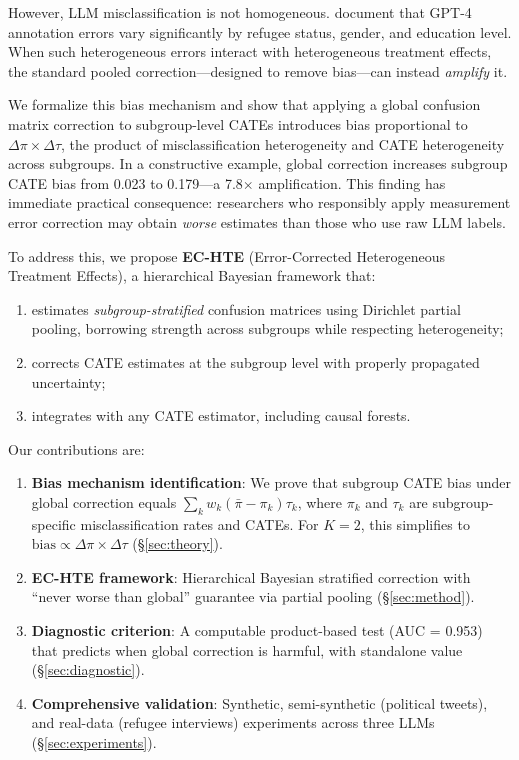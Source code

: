 \documentclass[11pt,a4paper]{article}
\newcommand{\bias}{\mathrm{bias}}
\begin{document}
However, LLM misclassification is not homogeneous. \citet{ashwin2025refugee} document that GPT-4 annotation errors vary significantly by refugee status, gender, and education level. When such heterogeneous errors interact with heterogeneous treatment effects, the standard pooled correction---designed to remove bias---can instead \emph{amplify} it.

We formalize this bias mechanism and show that applying a global confusion matrix correction to subgroup-level CATEs introduces bias proportional to $\Delta\pi \times \Delta\tau$, the product of misclassification heterogeneity and CATE heterogeneity across subgroups. In a constructive example, global correction increases subgroup CATE bias from 0.023 to 0.179---a 7.8$\times$ amplification. This finding has immediate practical consequence: researchers who responsibly apply measurement error correction may obtain \emph{worse} estimates than those who use raw LLM labels.

To address this, we propose \textbf{EC-HTE} (Error-Corrected Heterogeneous Treatment Effects), a hierarchical Bayesian framework that:
\begin{enumerate}[nosep,leftmargin=*]
\item estimates \emph{subgroup-stratified} confusion matrices using Dirichlet partial pooling, borrowing strength across subgroups while respecting heterogeneity;
\item corrects CATE estimates at the subgroup level with properly propagated uncertainty;
\item integrates with any CATE estimator, including causal forests.
\end{enumerate}

Our contributions are:
\begin{enumerate}[nosep,leftmargin=*]
\item \textbf{Bias mechanism identification}: We prove that subgroup CATE bias under global correction equals $\sum_k w_k (\bar{\pi} - \pi_k)\tau_k$, where $\pi_k$ and $\tau_k$ are subgroup-specific misclassification rates and CATEs. For $K=2$, this simplifies to $\bias \propto \Delta\pi \times \Delta\tau$ (\S\ref{sec:theory}).
\item \textbf{EC-HTE framework}: Hierarchical Bayesian stratified correction with ``never worse than global'' guarantee via partial pooling (\S\ref{sec:method}).
\item \textbf{Diagnostic criterion}: A computable product-based test (AUC = 0.953) that predicts when global correction is harmful, with standalone value (\S\ref{sec:diagnostic}).
\item \textbf{Comprehensive validation}: Synthetic, semi-synthetic (political tweets), and real-data (refugee interviews) experiments across three LLMs (\S\ref{sec:experiments}).
\end{enumerate}
\end{document}
